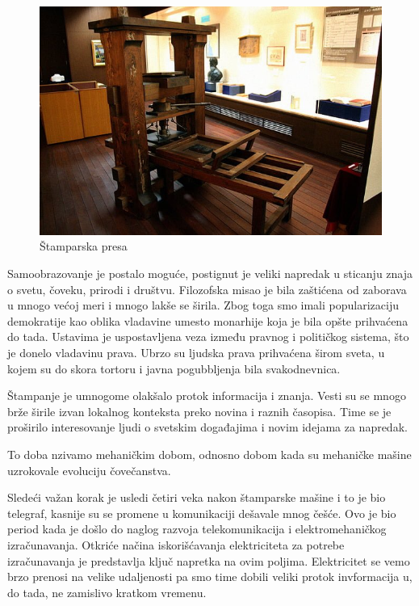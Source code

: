 \documentclass[12pt]{article}
\begin{document}
\begin{figure}
    \centering
    \includegraphics[scale=0.4]{stamparska-presa.jpg}
    \caption{Štamparska presa}
\end{figure}


	Samoobrazovanje je postalo moguće, postignut je veliki napredak u sticanju znaja o svetu, čoveku, prirodi i društvu. Filozofska misao je bila zaštićena od zaborava u mnogo većoj meri i mnogo lakše se širila. Zbog toga smo imali popularizaciju demokratije kao oblika vladavine umesto monarhije koja je bila opšte prihvaćena do tada. Ustavima je uspostavljena veza između pravnog i političkog sistema, što je donelo vladavinu prava. Ubrzo su ljudska prava prihvaćena širom sveta, u kojem su do skora tortoru i javna pogubbljenja bila svakodnevnica. 
	
	Štampanje je umnogome olakšalo protok informacija i znanja. Vesti su se mnogo brže širile izvan lokalnog konteksta preko novina i raznih časopisa. Time se je proširilo interesovanje ljudi o svetskim događajima i novim idejama za napredak.

	To doba nzivamo mehaničkim dobom, odnosno dobom kada su mehaničke mašine uzrokovale evoluciju čovečanstva.

	Sledeći važan korak je usledi četiri veka nakon štamparske mašine i to je bio telegraf, kasnije su se promene u komunikaciji dešavale mnog češće. Ovo je bio period kada je došlo do naglog razvoja telekomunikacija i elektromehaničkog izračunavanja. Otkriće načina iskorišćavanja elektriciteta za potrebe izračunavanja je predstavlja ključ napretka na ovim poljima. Elektricitet se vemo brzo prenosi na velike udaljenosti pa smo time dobili veliki protok invformacija u, do tada, ne zamislivo kratkom vremenu.
	
\end{document}
